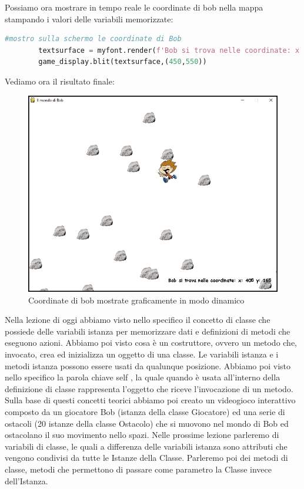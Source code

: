 \documentclass[12pt,a4paper]{article}
\begin{document}
Possiamo ora mostrare in tempo reale le coordinate di bob nella mappa stampando i valori delle variabili memorizzate: 

\begin{lstlisting}[language=Python, caption=Codice per mostrare sulla mappa le coordinate di Bob]
        #mostro sulla schermo le coordinate di Bob
        textsurface = myfont.render(f'Bob si trova nelle coordinate: x: {str(posizioneBob_x)} y: {str(posizioneBob_y)}',False, (0, 0, 0))
        game_display.blit(textsurface,(450,550))
\end{lstlisting}

Vediamo ora il risultato finale:

\begin{figure}[H]
\begin{center}
    \includegraphics[width=\textwidth,height=\textheight,keepaspectratio]{img/coordinate.PNG}
\end{center}
\caption{Coordinate di bob mostrate graficamente in modo dinamico}
\end{figure}

Nella lezione di oggi abbiamo visto nello specifico il concetto di classe che possiede delle variabili istanza per memorizzare dati e definizioni di metodi che eseguono azioni. Abbiamo poi visto cosa è un costruttore, ovvero un metodo che, invocato, crea ed inizializza un oggetto di una classe. Le variabili istanza e i metodi istanza possono essere usati da qualunque posizione. Abbiamo poi visto nello specifico la parola chiave self , la quale quando è usata all'interno della definizione di classe rappresenta l'oggetto che riceve l'invocazione di un metodo. Sulla base di questi concetti teorici abbiamo poi creato un videogioco interattivo composto da un giocatore Bob (istanza della classe Giocatore) ed una serie di ostacoli (20 istanze della classe Ostacolo) che si muovono nel mondo di Bob ed ostacolano il suo movimento nello spazi. Nelle prossime lezione parleremo di variabili di classe, le quali a differenza delle variabili istanza sono attributi che vengono condivisi da tutte le Istanze della Classe. Parleremo poi dei metodi di classe, metodi che permettono di passare come parametro la Classe invece dell'Istanza.
\end{document}
